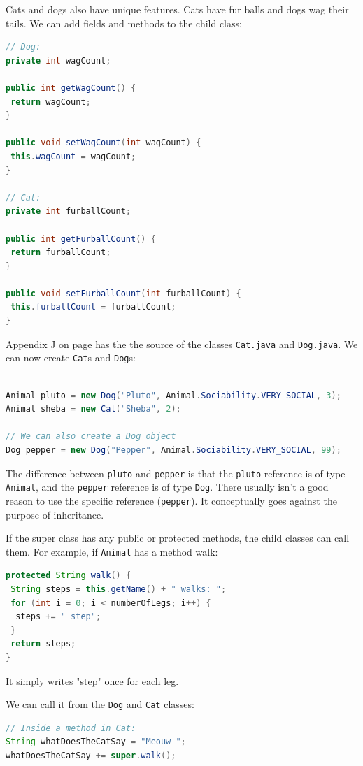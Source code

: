 Cats and dogs also have unique features.  Cats have fur balls and dogs wag their tails. We can add fields and methods to the child class:
\begin{lstlisting}[language=Java]
// Dog: 
private int wagCount;

public int getWagCount() {
 return wagCount;
}

public void setWagCount(int wagCount) {
 this.wagCount = wagCount;
}

// Cat:
private int furballCount;

public int getFurballCount() {
 return furballCount;
}

public void setFurballCount(int furballCount) {
 this.furballCount = furballCount;
}
\end{lstlisting}
Appendix J on page \pageref{App:AppendixJ} has the the source of the classes \texttt{Cat.java} and \texttt{Dog.java}.
We can now create \texttt{Cat}s and \texttt{Dog}s:
\begin{lstlisting}[language=Java]

Animal pluto = new Dog("Pluto", Animal.Sociability.VERY_SOCIAL, 3);
Animal sheba = new Cat("Sheba", 2);

// We can also create a Dog object
Dog pepper = new Dog("Pepper", Animal.Sociability.VERY_SOCIAL, 99);

\end{lstlisting}

The difference between \texttt{pluto} and \texttt{pepper} is that the \texttt{pluto} reference is of type \texttt{Animal}, and the \texttt{pepper} reference is of type \texttt{Dog}. There usually isn't a good reason to use the specific reference (\texttt{pepper}). It conceptually goes against the purpose of inheritance.

If the super class has any public or protected methods, the child classes can call them. For example, if \texttt{Animal} has a method walk:
\begin{lstlisting}[language=Java]
protected String walk() {
 String steps = this.getName() + " walks: ";
 for (int i = 0; i < numberOfLegs; i++) {
  steps += " step";
 }
 return steps;
}
\end{lstlisting}

It simply writes "step" once for each leg.

We can call it from the \texttt{Dog} and \texttt{Cat} classes:

\begin{lstlisting}[language=Java]
// Inside a method in Cat:
String whatDoesTheCatSay = "Meouw ";
whatDoesTheCatSay += super.walk();
\end{lstlisting}


